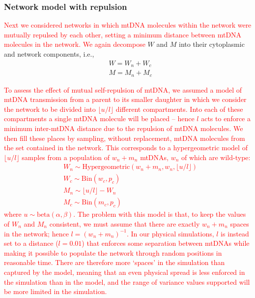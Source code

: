\documentclass{article}
\newcommand{\be}{\begin{equation}}
\newcommand{\ee}{\end{equation}}
\begin{document}
\begin{appendices}
\subsubsection*{Network model with repulsion}\label{app:model-repel}
\textcolor{red}{Next we considered networks in which mtDNA molecules within the network were mutually repulsed by each other, setting a minimum distance between mtDNA molecules in the network. We again decompose} $W$ and $M$ into their cytoplasmic and network components, i.e.,
\begin{equation*}
    \begin{split}
        & W = W_n + W_c\\
        & M = M_n + M_c
    \end{split}
\end{equation*}
\textcolor{red}{To assess the effect of mutual self-repulsion of mtDNA, we assumed a model of mtDNA transmission from a parent to its smaller daughter in which we consider the network to be divided into $\lfloor u/l \rfloor$ different compartments. Into each of these compartments a single mtDNA molecule will be placed -- hence $l$ acts to enforce a minimum inter-mtDNA distance due to the repulsion of mtDNA molecules. We then fill these places by sampling, without replacement, mtDNA molecules from the set contained in the network. This corresponds to a hypergeometric model of $\lfloor u/l \rfloor$ samples from a population of $w_n+m_n$ mtDNAs, $w_n$ of which are wild-type:
\be\label{eq:app-model-repel}
    \begin{split}
        & W_n \sim \mathrm{Hypergeometric}(w_n+m_n,w_n,\lfloor u/l \rfloor) \\
        & W_c \sim \mathrm{Bin}\left(w_c,p_c\right) \\
        & M_n \sim \lfloor u/l \rfloor-W_n \\
        & M_c \sim \mathrm{Bin}\left(m_c,p_c\right)
    \end{split}
\ee
where $u\sim\mathrm{beta}(\alpha,\beta)$. The problem with this model is that, to keep the values of $W_n$ and $M_n$ consistent, we must assume that there are exactly $w_n+m_n$ spaces in the network; hence $l=(w_n+m_n)^{-1}$.  In our physical simulations, $l$ is instead set to a distance ($l = 0.01$) that enforces some separation between mtDNAs while making it possible to populate the network through random positions in reasonable time. There are therefore more `spaces' in the simulation than captured by the model, meaning that an even physical spread is less enforced in the simulation than in the model, and the range of variance values supported will be more limited in the simulation.

}
\end{appendices}
\end{document}

